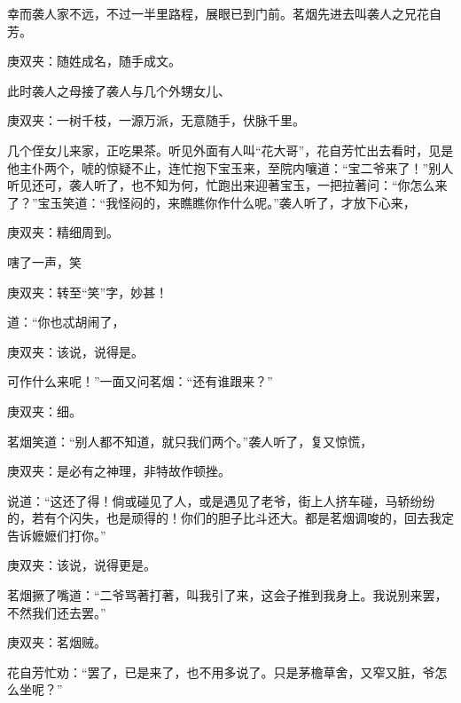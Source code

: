 \begin{parag}
    幸而袭人家不远，不过一半里路程，展眼已到门前。茗烟先进去叫袭人之兄花自芳。\begin{note}庚双夹：随姓成名，随手成文。\end{note}此时袭人之母接了袭人与几个外甥女儿、\begin{note}庚双夹：一树千枝，一源万派，无意随手，伏脉千里。\end{note}几个侄女儿来家，正吃果茶。听见外面有人叫“花大哥”，花自芳忙出去看时，见是他主仆两个，唬的惊疑不止，连忙抱下宝玉来，至院内嚷道：“宝二爷来了！”别人听见还可，袭人听了，也不知为何，忙跑出来迎著宝玉，一把拉著问：“你怎么来了？”宝玉笑道：“我怪闷的，来瞧瞧你作什么呢。”袭人听了，才放下心来，\begin{note}庚双夹：精细周到。\end{note}嗐了一声，笑\begin{note}庚双夹：转至“笑”字，妙甚！\end{note}道：“你也忒胡闹了，\begin{note}庚双夹：该说，说得是。\end{note}可作什么来呢！”一面又问茗烟：“还有谁跟来？”\begin{note}庚双夹：细。\end{note}茗烟笑道：“别人都不知道，就只我们两个。”袭人听了，复又惊慌，\begin{note}庚双夹：是必有之神理，非特故作顿挫。\end{note}说道：“这还了得！倘或碰见了人，或是遇见了老爷，街上人挤车碰，马轿纷纷的，若有个闪失，也是顽得的！你们的胆子比斗还大。都是茗烟调唆的，回去我定告诉嬷嬷们打你。”\begin{note}庚双夹：该说，说得更是。\end{note}茗烟撅了嘴道：“二爷骂著打著，叫我引了来，这会子推到我身上。我说别来罢，不然我们还去罢。”\begin{note}庚双夹：茗烟贼。\end{note}花自芳忙劝：“罢了，已是来了，也不用多说了。只是茅檐草舍，又窄又脏，爷怎么坐呢？”
\end{parag}



